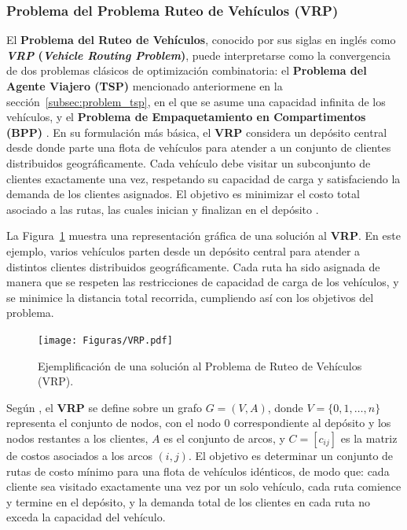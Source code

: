 \documentclass[12pt,titlepage,twoside,openright]{book}
\begin{document}
\subsubsection{Problema del Problema Ruteo de Vehículos (VRP)}
\label{subsec:problem_vrp}

El \textbf{Problema del Ruteo de Vehículos}, conocido por sus siglas en inglés como \textbf{\textit{VRP} (\emph{Vehicle Routing Problem})}, puede interpretarse como la convergencia de dos problemas clásicos de optimización combinatoria: el \textbf{Problema del Agente Viajero (TSP)} mencionado anteriormene en la sección~\ref{subsec:problem_tsp}, en el que se asume una capacidad infinita de los vehículos, y el \textbf{Problema de Empaquetamiento en Compartimentos (BPP)} \cite{daza2009}. En su formulación más básica, el \textbf{VRP} considera un depósito central desde donde parte una flota de vehículos para atender a un conjunto de clientes distribuidos geográficamente. Cada vehículo debe visitar un subconjunto de clientes exactamente una vez, respetando su capacidad de carga y satisfaciendo la demanda de los clientes asignados. El objetivo es minimizar el costo total asociado a las rutas, las cuales inician y finalizan en el depósito \cite{montes2017}.

La Figura~\ref{fig:vrp} muestra una representación gráfica de una solución al \textbf{VRP}. En este ejemplo, varios vehículos parten desde un depósito central para atender a distintos clientes distribuidos geográficamente. Cada ruta ha sido asignada de manera que se respeten las restricciones de capacidad de carga de los vehículos, y se minimice la distancia total recorrida, cumpliendo así con los objetivos del problema.

\begin{figure}[H]
	\centering
	\texttt{[image: Figuras/VRP.pdf]}
	\caption{Ejemplificación de una solución al Problema de Ruteo de Vehículos (VRP).}
	\label{fig:vrp}
\end{figure}

Según \citep{toth2014}, el \textbf{VRP}  se define sobre un grafo $G = (V, A)$, donde $V = \{0, 1, \dots, n\}$ representa el conjunto de nodos, con el nodo $0$ correspondiente al depósito y los nodos restantes a los clientes, $A$ es el conjunto de arcos, y $C = [c_{ij}]$ es la matriz de costos asociados a los arcos $(i, j)$. El objetivo es determinar un conjunto de rutas de costo mínimo para una flota de vehículos idénticos, de modo que: cada cliente sea visitado exactamente una vez por un solo vehículo, cada ruta comience y termine en el depósito, y la demanda total de los clientes en cada ruta no exceda la capacidad del vehículo.
\end{document}
